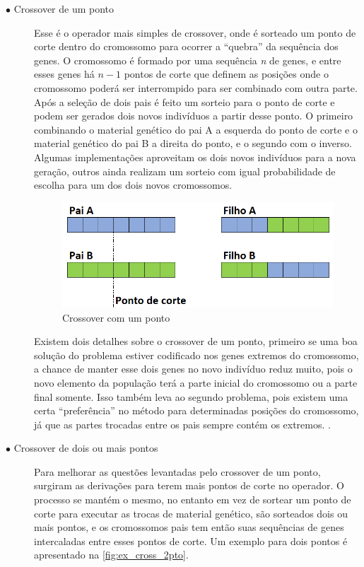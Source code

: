\begin{description}
\item[$\bullet$ Crossover de um ponto] \text{}

Esse é o operador mais simples de crossover, onde é sorteado um ponto de corte dentro do cromossomo para ocorrer a ``quebra'' da sequência dos genes. O cromossomo é formado por uma sequência \textit{n} de genes, e entre esses genes há \(n-1\) pontos de corte que definem as posições onde o cromossomo poderá ser interrompido para ser combinado com outra parte. Após a seleção de dois pais é feito um sorteio para o ponto de corte e podem ser gerados dois novos indivíduos a partir desse ponto. O primeiro combinando o material genético do pai A a esquerda do ponto de corte e o material genético do pai B a direita do ponto, e o segundo com o inverso. Algumas implementações aproveitam os dois novos indivíduos para a nova geração, outros ainda realizam um sorteio com igual probabilidade de escolha para um dos dois novos cromossomos.

\begin{figure}[ht]
	\centering
	\includegraphics[width=0.75\linewidth]{imagens/exemplo_cross_1pto.png}
	\caption{Crossover com um ponto}
	\label{fig:ex_cross_1pto}
\end{figure}

Existem dois detalhes sobre o crossover de um ponto, primeiro se uma boa solução do problema estiver codificado nos genes extremos do cromossomo, a chance de manter esse dois genes no novo indivíduo reduz muito, pois o novo elemento da população terá a parte inicial do cromossomo ou a parte final somente. Isso também leva ao segundo problema, pois existem uma certa ``preferência'' no método para determinadas posições do cromossomo, já que as partes trocadas entre os pais sempre contém os extremos. \cite{Mitchell1996}.

\item[$\bullet$ Crossover de dois ou mais pontos] \text{}

Para melhorar as questões levantadas pelo crossover de um ponto, surgiram as derivações para terem mais pontos de corte no operador. O processo se mantém o mesmo, no entanto em vez de sortear um ponto de corte para executar as trocas de material genético, são sorteados dois ou mais pontos, e os cromossomos pais tem então suas sequências de genes intercaladas entre esses pontos de corte. Um exemplo para dois pontos é apresentado na \autoref{fig:ex_cross_2pto}.


\end{description}
